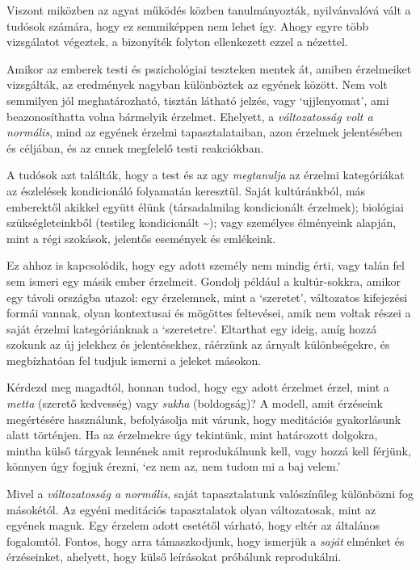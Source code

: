 Viszont miközben az agyat működés közben tanulmányozták, nyilvánvalóvá
vált a tudósok számára, hogy ez semmiképpen nem lehet így. Ahogy egyre
több vizsgálatot végeztek, a bizonyíték folyton ellenkezett ezzel a
nézettel.

Amikor az emberek testi és pszichológiai teszteken mentek át, amiben
érzelmeiket vizsgálták, az eredmények nagyban különböztek az egyének
között. Nem volt semmilyen jól meghatározható, tisztán látható jelzés,
vagy `ujjlenyomat', ami beazonosíthatta volna bármelyik érzelmet.
Ehelyett, a \emph{változatosság volt a normális}, mind az egyének
érzelmi tapasztalataiban, azon érzelmek jelentésében és céljában, és az
ennek megfelelő testi reakciókban.

A tudósok azt találták, hogy a test és az agy \emph{megtanulja} az
érzelmi kategóriákat az észlelések kondicionáló folyamatán keresztül.
Saját kultúránkból, más emberektől akikkel együtt élünk (társadalmilag
kondicionált érzelmek); biológiai szükségleteinkből (testileg
kondicionált \textasciitilde); vagy személyes élményeink alapján, mint a
régi szokások, jelentős események és emlékeink.

Ez ahhoz is kapcsolódik, hogy egy adott személy nem mindig érti, vagy
talán fel sem ismeri egy másik ember érzelmeit. Gondolj például a
kultúr-sokkra, amikor egy távoli országba utazol: egy érzelemnek, mint a
`szeretet', változatos kifejezési formái vannak, olyan kontextusai és
mögöttes feltevései, amik nem voltak részei a saját érzelmi
kategóriánknak a `szeretetre'. Eltarthat egy ideig, amíg hozzá szokunk
az új jelekhez és jelentésekhez, ráérzünk az árnyalt különbségekre, és
megbízhatóan fel tudjuk ismerni a jeleket másokon.

Kérdezd meg magadtól, honnan tudod, hogy egy adott érzelmet érzel, mint
a \emph{metta} (szerető kedvesség) vagy \emph{sukha} (boldogság)? A
modell, amit érzéseink megértésére használunk, befolyásolja mit várunk,
hogy meditációs gyakorlásunk alatt történjen. Ha az érzelmekre úgy
tekintünk, mint határozott dolgokra, mintha külső tárgyak lennének amit
reprodukálnunk kell, vagy hozzá kell férjünk, könnyen úgy fogjuk érezni,
`ez nem az, nem tudom mi a baj velem.'

Mivel a \emph{változatosság a normális}, saját tapasztalatunk
valószínűleg különbözni fog másokétól. Az egyéni meditációs
tapasztalatok olyan változatosak, mint az egyének maguk. Egy érzelem
adott esetétől várható, hogy eltér az általános fogalomtól. Fontos, hogy
arra támaszkodjunk, hogy ismerjük a \emph{saját} elménket és
érzéseinket, ahelyett, hogy külső leírásokat próbálunk reprodukálni.

